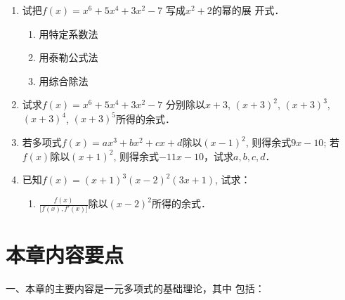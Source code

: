 \begin{enumerate}
\item 试把$f(x)=x^6+5x^4+3x^2-7$ 写成$x^2+2$的幂的展
开式．
\begin{multicols}{3}
    \begin{enumerate}
        \item 用特定系数法
        \item 用泰勒公式法
        \item 用综合除法
    \end{enumerate}
\end{multicols}
\item 试求$f(x)=x^6+5x^4+3x^2-7$ 分别除以$x+3$,
$(x+3)^2$, $(x+3)^3$, $(x+3)^4$, $(x+3)^5$所得的余式．

\item 若多项式$f(x)=ax^3+bx^2+cx+d$除以$(x-1)^2$, 则得余式$9x-10$; 若$f(x)$除以$(x+1)^2$, 则得余式$-11x-10$，试求$a,b,c,d$．

\item 已知$f(x)=(x+1)^3(x-2)^2(3x+1)$, 试求：
\begin{enumerate}
    \item $\frac{f(x)}{\big[f(x),f'(x)\big]}$除以$(x-2)^2$所得的余式．
\end{enumerate}
\end{enumerate}

\section*{本章内容要点}

一、本章的主要内容是一元多项式的基础理论，其中
包括：

